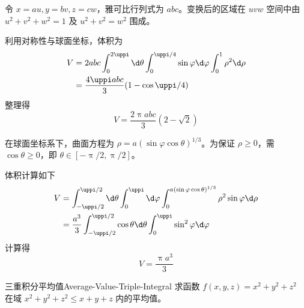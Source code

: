 \begin{solution}
     令 $x = au, y = bv, z = cw$，雅可比行列式为 $abc$。变换后的区域在 $uvw$ 空间中由 $u^2+v^2+w^2=1$ 及 $u^2+v^2=w^2$ 围成。

    利用对称性与球面坐标，体积为
    \begin{equation}
        \begin{aligned}
            V & = 2 abc \int_0^{2\uppi} \d \theta \int_0^{\uppi/4} \sin \varphi \d \varphi \int_0^1 \rho^2 \d \rho \\
              & = \frac{4\uppi abc}{3} (1 - \cos \uppi/4)
        \end{aligned}
    \end{equation}
    整理得
    \begin{equation}
        V = \boxed{\frac{2\uppi abc}{3} (2 - \sqrt{2})}
    \end{equation}

     在球面坐标系下，曲面方程为 $\rho = a (\sin \varphi \cos \theta)^{1/3}$。为保证 $\rho \ge 0$，需 $\cos \theta \ge 0$，即 $\theta \in [-\uppi/2, \uppi/2]$。

    体积计算如下
    \begin{equation}
        \begin{aligned}
            V & = \int_{-\uppi/2}^{\uppi/2} \d \theta \int_0^{\uppi} \d \varphi \int_0^{a(\sin \varphi \cos \theta)^{1/3}} \rho^2 \sin \varphi \d \rho \\
              & = \frac{a^3}{3} \int_{-\uppi/2}^{\uppi/2} \cos \theta \d \theta \int_0^{\uppi} \sin^2 \varphi \d \varphi
        \end{aligned}
    \end{equation}
    计算得
    \begin{equation}
        V = \boxed{\frac{\uppi a^3}{3}}
    \end{equation}
\end{solution}

\begin{problem}{三重积分平均值}{Average-Value-Triple-Integral}
    求函数 $f(x, y, z) = x^2 + y^2 + z^2$ 在域 $x^2 + y^2 + z^2 \leqslant x + y + z$ 内的平均值。
\end{problem}

